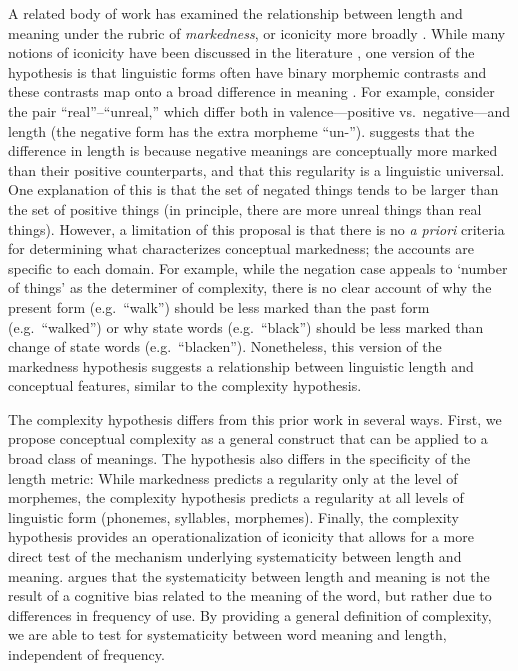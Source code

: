 A related body of work has examined the relationship between length and meaning under the rubric of {\it markedness}, or iconicity more broadly \cite{jakobson1966quest}. While many notions of iconicity have been discussed in the literature \cite{haspelmath2006against,haspelmath2008frequency}, one version of the hypothesis is that linguistic forms often have binary morphemic contrasts and these contrasts map onto a broad difference in meaning \cite{greenberg1966}. For example, consider the pair ``real''--``unreal,'' which differ both in valence---positive vs.\ negative---and length (the negative form has the extra morpheme ``un-'').  suggests that the difference in length is because negative meanings are conceptually more marked than their positive counterparts, and that this regularity is a linguistic universal. One explanation of this is that the set of negated things tends to be larger than the set of positive things (in principle, there are more unreal things than real things). However, a limitation of this proposal is that there is no {\it a priori} criteria for determining what characterizes conceptual markedness; the accounts are specific to each domain. For example, while the negation case appeals to `number of things' as the determiner of complexity, there is no clear account of why the present form (e.g.\ ``walk'') should be less marked than the past  form (e.g.\ ``walked'') or why state words (e.g.\ ``black'') should be less marked than change of state words (e.g.\ ``blacken''). Nonetheless, this version of the markedness hypothesis suggests a relationship between linguistic length and conceptual features, similar to the complexity hypothesis. 

The complexity hypothesis differs from this prior work in several ways.  First, we propose conceptual complexity as a general construct that can be applied to a broad class of meanings. The hypothesis also differs in the specificity of the length metric: While markedness predicts a regularity only at the level of morphemes, the complexity hypothesis predicts a regularity at all levels of linguistic form (phonemes, syllables, morphemes). Finally, the complexity hypothesis provides an operationalization of iconicity that allows for a more direct test of the mechanism underlying systematicity between length and meaning.   argues that the systematicity between length and meaning is not the result of a cognitive bias related to the meaning of the word, but rather due to differences in frequency of use. By providing a general definition of complexity, we are able to test for systematicity between word meaning and length, independent of frequency. 

